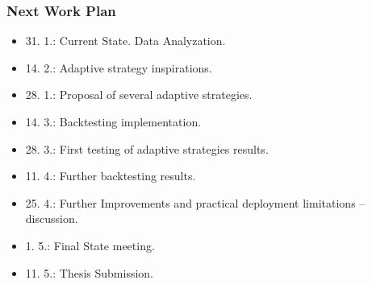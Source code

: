 \begin{frame}
  \frametitle{Next Work Plan}
  \begin{itemize}
    \item 31. 1.: Current State. Data Analyzation.
    \item 14. 2.: Adaptive strategy inspirations.
    \item 28. 1.: Proposal of several adaptive strategies.
    \item 14. 3.: Backtesting implementation.
    \item 28. 3.: First testing of adaptive strategies results.
    \item 11. 4.: Further backtesting results.
    \item 25. 4.: Further Improvements and practical deployment limitations -- discussion.
    \item 1. 5.: Final State meeting.
    \item 11. 5.: Thesis Submission.
  \end{itemize}
\end{frame}





